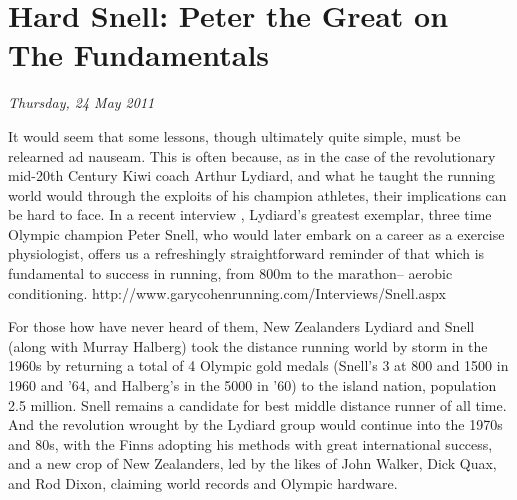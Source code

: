 \chapter{Hard Snell: Peter the Great on The Fundamentals}
\textit{Thursday, 24 May 2011}
\bigskip

It would seem that some lessons, though ultimately quite simple, must be relearned ad nauseam. This is often because, as in the case of the revolutionary mid-20th Century Kiwi coach Arthur Lydiard, and what he taught the running world would through the exploits of his champion athletes, their implications can be hard to face. In a recent interview , Lydiard's greatest exemplar, three time Olympic champion Peter Snell, who would later embark on a career as a exercise physiologist, offers us a refreshingly straightforward reminder of that which is fundamental to success in running, from 800m to the marathon-- aerobic conditioning.
http://www.garycohenrunning.com/Interviews/Snell.aspx

For those how have never heard of them, New Zealanders Lydiard and Snell (along with Murray Halberg) took the distance running world by storm in the 1960s by returning a total of 4 Olympic gold medals (Snell's 3 at 800 and 1500 in 1960 and '64, and Halberg's in the 5000 in '60) to the island nation, population 2.5 million. Snell remains a candidate for best middle distance runner of all time. And the revolution wrought by the Lydiard group would continue into the 1970s and 80s, with the Finns adopting his methods with great international success, and a new crop of New Zealanders, led by the likes of John Walker, Dick Quax, and Rod Dixon, claiming world records and Olympic hardware.

